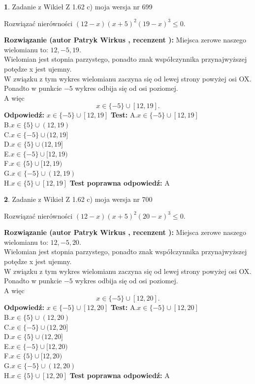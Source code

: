\documentclass[12pt, a4paper]{article}
\theoremstyle{definition} %
\newtheorem{zad}{}
\newcommand{\zadStart}[1]{\begin{zad}#1\newline}
\newcommand{\zadStop}{\end{zad}}
\newcommand{\rozwStart}[2]{\noindent \textbf{Rozwiązanie (autor #1 , recenzent #2): }\newline}
\newcommand{\rozwStop}{\newline}
\newcommand{\odpStart}{\noindent \textbf{Odpowiedź:}\newline}
\newcommand{\odpStop}{\newline}
\newcommand{\testStart}{\noindent \textbf{Test:}\newline}
\newcommand{\testStop}{\newline}
\newcommand{\kluczStart}{\noindent \textbf{Test poprawna odpowiedź:}\newline}
\newcommand{\kluczStop}{\newline}
\begin{document}
\zadStart{Zadanie z Wikieł Z 1.62 c) moja wersja nr 699}

Rozwiązać nierówności $(12-x)(x+5)^{2}(19-x)^{3}\le0$.
\zadStop
\rozwStart{Patryk Wirkus}{}
Miejsca zerowe naszego wielomianu to: $12, -5, 19$.\\
Wielomian jest stopnia parzystego, ponadto znak współczynnika przy\linebreak najwyższej potędze x jest ujemny.\\ W związku z tym wykres wielomianu zaczyna się od lewej strony powyżej osi OX.\\
Ponadto w punkcie $-5$ wykres odbija się od osi poziomej.\\
A więc $$x \in \{-5\} \cup [12,19].$$
\rozwStop
\odpStart
$x \in \{-5\} \cup [12,19]$
\odpStop
\testStart
A.$x \in \{-5\} \cup [12,19]$\\
B.$x \in \{5\} \cup (12,19)$\\
C.$x \in \{-5\} \cup (12,19]$\\
D.$x \in \{5\} \cup (12,19]$\\
E.$x \in \{-5\} \cup [12,19)$\\
F.$x \in \{5\} \cup [12,19)$\\
G.$x \in \{-5\} \cup (12,19)$\\
H.$x \in \{5\} \cup [12,19]$
\testStop
\kluczStart
A
\kluczStop



\zadStart{Zadanie z Wikieł Z 1.62 c) moja wersja nr 700}

Rozwiązać nierówności $(12-x)(x+5)^{2}(20-x)^{3}\le0$.
\zadStop
\rozwStart{Patryk Wirkus}{}
Miejsca zerowe naszego wielomianu to: $12, -5, 20$.\\
Wielomian jest stopnia parzystego, ponadto znak współczynnika przy\linebreak najwyższej potędze x jest ujemny.\\ W związku z tym wykres wielomianu zaczyna się od lewej strony powyżej osi OX.\\
Ponadto w punkcie $-5$ wykres odbija się od osi poziomej.\\
A więc $$x \in \{-5\} \cup [12,20].$$
\rozwStop
\odpStart
$x \in \{-5\} \cup [12,20]$
\odpStop
\testStart
A.$x \in \{-5\} \cup [12,20]$\\
B.$x \in \{5\} \cup (12,20)$\\
C.$x \in \{-5\} \cup (12,20]$\\
D.$x \in \{5\} \cup (12,20]$\\
E.$x \in \{-5\} \cup [12,20)$\\
F.$x \in \{5\} \cup [12,20)$\\
G.$x \in \{-5\} \cup (12,20)$\\
H.$x \in \{5\} \cup [12,20]$
\testStop
\kluczStart
A
\kluczStop
\end{document}
